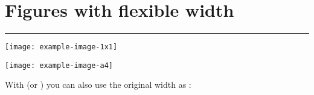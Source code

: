 

\section{Figures with flexible width}

\hrule %

\texttt{[image: example-image-1x1]}

\texttt{[image: example-image-a4]}

With \texttt{\adjincludegraphics} (or \texttt{\adjustimage}) you can also use the original width as \texttt{\width}:

